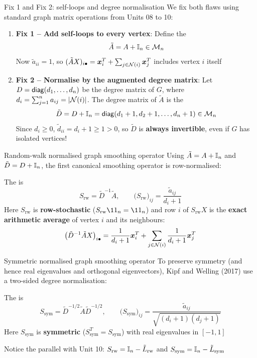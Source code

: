 \documentclass[aspectratio=169]{beamer}\usepackage[]{graphicx}\usepackage[]{xcolor}
\begin{document}
\begin{frame}{Fix 1 and Fix 2: self-loops and degree normalisation}
We fix both flaws using standard graph matrix operations from Units 08 to 10:
\vfill
\begin{enumerate}
\item \textbf{Fix 1 -- Add self-loops to every vertex}:
Define the 
\[
\tilde{A} = A + \mathbb{I}_n \in \mathcal{M}_n
\]
Now $\tilde{a}_{ii} = 1$, so $(\tilde{A}X)_{i\bullet} = \bm{x}_i^T + \sum_{j \in \mathcal{N}(i)} \bm{x}_j^T$ includes vertex $i$ itself
\vfill
\item \textbf{Fix 2 -- Normalise by the augmented degree matrix}:
Let $D = \mathsf{diag}(d_1, \ldots, d_n)$ be the degree matrix of $G$, where $d_i = \sum_{j=1}^n a_{ij} = |\mathcal{N}(i)|$. The degree matrix of $\tilde{A}$ is the 
\[
\tilde{D} = D + \mathbb{I}_n = \mathsf{diag}(d_1 + 1, d_2 + 1, \ldots, d_n + 1) \in \mathcal{M}_n
\]
Since $d_i \ge 0$, $\tilde{d}_{ii} = d_i + 1 \ge 1 > 0$, so $\tilde{D}$ is \textbf{always invertible}, even if $G$ has isolated vertices!
\end{enumerate}
\end{frame}


\begin{frame}{Random-walk normalised graph smoothing operator}
Using $\tilde{A} = A + \mathbb{I}_n$ and $\tilde{D} = D + \mathbb{I}_n$, the first canonical smoothing operator is row-normalised:
\vfill
\begin{definition}
\label{def:gcn-operators}
The  is
\[
S_{\text{rw}} = \tilde{D}^{-1} \tilde{A}, \qquad \big(S_{\text{rw}}\big)_{ij} = \frac{\tilde{a}_{ij}}{d_i + 1}
\]
Here $S_{\text{rw}}$ is \textbf{row-stochastic} ($S_{\text{rw}} \11_n = \11_n$) and row $i$ of $S_{\text{rw}} X$ is the \textbf{exact arithmetic average} of vertex $i$ and its neighbours:
\[
\big(\tilde{D}^{-1}\tilde{A} X\big)_{i\bullet} = \frac{1}{d_i + 1}\bm{x}_i^T + \sum_{j \in \mathcal{N}(i)} \frac{1}{d_i + 1}\bm{x}_j^T
\]
\end{definition}
\end{frame}


\begin{frame}{Symmetric normalised graph smoothing operator}
To preserve symmetry (and hence real eigenvalues and orthogonal eigenvectors), Kipf and Welling (2017) use a two-sided degree normalisation:
\vfill
\begin{definition}
The  is
\[
S_{\text{sym}} = \tilde{D}^{-1/2} \tilde{A} \tilde{D}^{-1/2}, \qquad \big(S_{\text{sym}}\big)_{ij} = \frac{\tilde{a}_{ij}}{\sqrt{(d_i + 1)(d_j + 1)}}
\]
Here $S_{\text{sym}}$ is \textbf{symmetric} ($S_{\text{sym}}^T = S_{\text{sym}}$) with real eigenvalues in $[-1, 1]$
\end{definition}
\vfill
Notice the parallel with Unit 10: $S_{\text{rw}} = \mathbb{I}_n - \tilde{L}_{\text{rw}}$ and $S_{\text{sym}} = \mathbb{I}_n - \tilde{L}_{\text{sym}}$
\end{frame}
\end{document}
